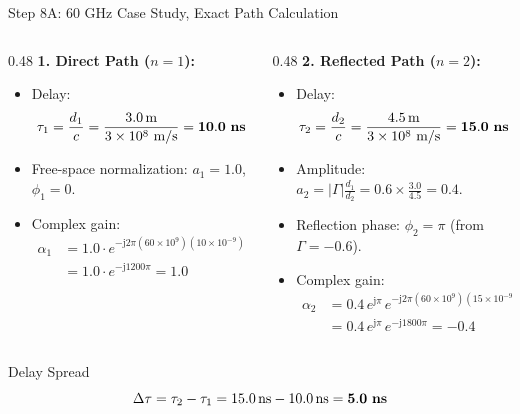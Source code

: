 \documentclass[10pt,aspectratio=169]{beamer}
\newcommand{\jj}{\mathrm{j}}
\begin{document}
\begin{frame}{Step 8A: 60 GHz Case Study, Exact Path Calculation}
  \begin{columns}[T]
    \begin{column}{0.48\textwidth}
      \textbf{1. Direct Path ($n=1$):}
      \begin{itemize}
        \item Delay:
        \begin{equation}
          \tau_1 = \frac{d_1}{c} = \frac{\SI{3.0}{\meter}}{3 \times 10^8\text{ m/s}} = \mathbf{10.0\text{ \textbf{ns}}}
        \end{equation}
        \item Free-space normalization: $a_1 = 1.0$, $\phi_1 = 0$.
        \item Complex gain:
        \begin{align}
          \alpha_1 &= 1.0 \cdot e^{-\jj 2\pi (60 \times 10^9)(10 \times 10^{-9})} \nonumber \\
                   &= 1.0 \cdot e^{-\jj 1200\pi} = \mathbf{1.0}
        \end{align}
      \end{itemize}
    \end{column}

    \begin{column}{0.48\textwidth}
      \textbf{2. Reflected Path ($n=2$):}
      \begin{itemize}
        \item Delay:
        \begin{equation}
          \tau_2 = \frac{d_2}{c} = \frac{\SI{4.5}{\meter}}{3 \times 10^8\text{ m/s}} = \mathbf{15.0\text{ \textbf{ns}}}
        \end{equation}
        \item Amplitude: $a_2 = |\Gamma| \frac{d_1}{d_2} = 0.6 \times \frac{3.0}{4.5} = \mathbf{0.4}$.
        \item Reflection phase: $\phi_2 = \pi$ (from $\Gamma = -0.6$).
        \item Complex gain:
        \begin{align}
          \alpha_2 &= 0.4 \, e^{\jj\pi} \, e^{-\jj 2\pi (60 \times 10^9)(15 \times 10^{-9})} \nonumber \\
                   &= 0.4 \, e^{\jj\pi} \, e^{-\jj 1800\pi} = \mathbf{-0.4}
        \end{align}
      \end{itemize}
    \end{column}
  \end{columns}

  \begin{exampleblock}{Delay Spread}
    \begin{equation}
      \Delta\tau = \tau_2 - \tau_1 = \SI{15.0}{\nano\second} - \SI{10.0}{\nano\second} = \mathbf{5.0\text{ \textbf{ns}}}
    \end{equation}
  \end{exampleblock}
\end{frame}
\end{document}
